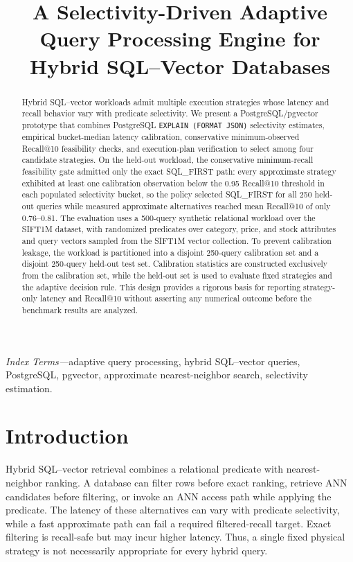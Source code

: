 \documentclass[conference]{IEEEtran}
\title{A Selectivity-Driven Adaptive Query Processing Engine for Hybrid SQL--Vector Databases}
\author{\IEEEauthorblockN{Anonymous Author}
\IEEEauthorblockA{\textit{Department of Computer Science and Engineering}\\
\textit{Vellore Institute of Technology, Chennai}\\
Chennai, India}}
\begin{document}
\maketitle

\begin{abstract}
Hybrid SQL--vector workloads admit multiple execution strategies whose latency and recall behavior vary with predicate selectivity. We present a PostgreSQL/pgvector prototype that combines PostgreSQL \texttt{EXPLAIN (FORMAT JSON)} selectivity estimates, empirical bucket-median latency calibration, conservative minimum-observed Recall@10 feasibility checks, and execution-plan verification to select among four candidate strategies. On the held-out workload, the conservative minimum-recall feasibility gate admitted only the exact SQL\_FIRST path: every approximate strategy exhibited at least one calibration observation below the 0.95 Recall@10 threshold in each populated selectivity bucket, so the policy selected SQL\_FIRST for all 250 held-out queries while measured approximate alternatives reached mean Recall@10 of only 0.76--0.81. The evaluation uses a 500-query synthetic relational workload over the SIFT1M dataset, with randomized predicates over category, price, and stock attributes and query vectors sampled from the SIFT1M vector collection. To prevent calibration leakage, the workload is partitioned into a disjoint 250-query calibration set and a disjoint 250-query held-out test set. Calibration statistics are constructed exclusively from the calibration set, while the held-out set is used to evaluate fixed strategies and the adaptive decision rule. This design provides a rigorous basis for reporting strategy-only latency and Recall@10 without asserting any numerical outcome before the benchmark results are analyzed.
\end{abstract}

\noindent\textit{Index Terms---}adaptive query processing, hybrid SQL--vector queries, PostgreSQL, pgvector, approximate nearest-neighbor search, selectivity estimation.

\section{Introduction}
Hybrid SQL--vector retrieval combines a relational predicate with nearest-neighbor ranking. A database can filter rows before exact ranking, retrieve ANN candidates before filtering, or invoke an ANN access path while applying the predicate. The latency of these alternatives can vary with predicate selectivity, while a fast approximate path can fail a required filtered-recall target. Exact filtering is recall-safe but may incur higher latency. Thus, a single fixed physical strategy is not necessarily appropriate for every hybrid query.
\end{document}
